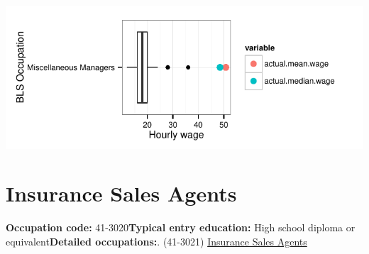 \documentclass[a4paper,10pt]{article}\usepackage[]{graphicx}\usepackage[]{color}
\makeatletter
\def\maxwidth{ %
  \ifdim\Gin@nat@width>\linewidth
    \linewidth
  \else
    \Gin@nat@width
  \fi
}
\makeatother
\begin{document}
{\centering \includegraphics[width=\maxwidth]{figure/unnamed-chunk-295} 

}


\newpage\section{Insurance Sales Agents}\textbf{Occupation code:} 41-3020\newline\textbf{Typical entry education:} High school diploma or equivalent\newline\textbf{Detailed occupations:}. (41-3021)  \href{http://www.bls.gov/oes/current/oes413021.htm}{Insurance Sales Agents}\newline%
\end{document}
